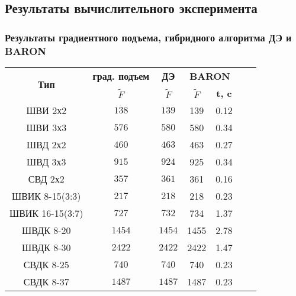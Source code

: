\subsection{Результаты вычислительного эксперимента}

\begin{frame}
    \frametitle{Результаты градиентного подъема, гибридного алгоритма ДЭ и BARON}
\begin{table}[!h]

\centering
\begin{tabular}{|c|c|c|cc|c c|}
    \hline
    \multirow{2}{*}{\textbf{Тип}} & \textbf{град. подъем} & \textbf{ДЭ} & \multicolumn{2}{|c|}{\textbf{BARON}} \\
    & \textbf{$\tilde{F}$} & \textbf{$\tilde{F}$} & \textbf{$\tilde{F}$} & \textbf{t, c}  \\
    \hline
    ШВИ 2х2         & ${138}$  & ${139}$   & 139    & 0.12      \\
    ШВИ 3х3         & ${576}$ & ${580}$   & 580    & 0.34       \\
    ШВД 2х2         & ${460}$ & ${463}$   & 463    & 0.27     \\
    ШВД 3х3         & ${915}$ & ${924}$   & 925    & 0.34        \\
    СВД 2х2        & ${357}$  & ${361}$   & 361    & 0.16         \\
    ШВИК 8-15(3:3) & ${217}$  & ${218}$   & 218    & 0.23       \\
    ШВИК 16-15(3:7)& ${727}$  & ${732}$   & 734    & 1.37     \\
    ШВДК 8-20      & ${1454}$  & ${1454}$  & 1455   & 2.78       \\
    ШВДК 8-30      & ${2422}$  & ${2422}$  & 2422   & 1.47     \\
    СВДК 8-25      & ${740}$  & ${740}$   & 740    & 0.23        \\
    СВДК 8-37      & ${1487}$  & ${1487}$  & 1487   & 0.23      \\
    \hline
\end{tabular}
\label{tab:results_de}
\end{table}
\end{frame}


